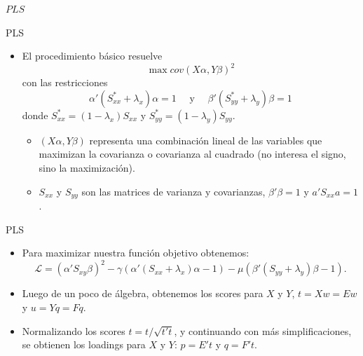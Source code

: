 \documentclass{beamer}
\newcommand{\?}{?`}
\begin{document}
\begin{frame}{}
  \begin{block}{}
    \begin{center}
      \vspace{3mm}
      {\Large $PLS$}
      \vspace{3mm}
    \end{center}
  \end{block}
\end{frame}
 
\begin{frame}{PLS}
  \begin{itemize}
  \item El procedimiento b\'asico resuelve
    \begin{displaymath}
      \max cov(X\alpha,Y\beta)^2
    \end{displaymath}
    con las restricciones
    \begin{displaymath}
      \alpha'(S_{xx}^{*}+\lambda_x)\alpha = 1 \quad \text{ y } \quad
      \beta'(S_{yy}^{*}+\lambda_y)\beta = 1 
    \end{displaymath}
    donde $S_{xx}^{*}=(1-\lambda_x)S_{xx}$ y
    $S_{yy}^{*}=(1-\lambda_y)S_{yy}$.
    \begin{itemize}
    \item $(X\alpha,Y\beta)$ representa una combinaci\'on lineal de
      las variables que maximizan la covarianza o covarianza al
      cuadrado (no interesa el signo, sino la maximizaci\'on).
    \item $S_{xx}$ y $S_{yy}$ son las matrices de varianza y
      covarianzas, $\beta'\beta=1$ y $a'S_{xx}a=1$.
    \end{itemize}
  \end{itemize}
\end{frame}
 
\begin{frame}{PLS}
  \begin{itemize}
  \item Para maximizar nuestra funci\'on objetivo obtenemos:
    \begin{displaymath}
      \mathcal{L}=
      (\alpha'S_{xy}\beta)^2-\gamma(\alpha'(S_{xx}+\lambda_x)\alpha-1)
      - \mu(\beta'(S_{yy}+\lambda_y)\beta-1).
    \end{displaymath}
  \item Luego de un poco de \'algebra, obtenemos los scores para $X$ y
    $Y$, $t=Xw=Ew$ y $u=Yq=Fq$.
  \item Normalizando los scores $t=t/\sqrt{t't}$, y continuando con m\'as
    simplificaciones, se obtienen los loadings para $X$ y $Y$: $p=E't$
    y $q=F't$.
  \end{itemize}
\end{frame}
 
\end{document}
